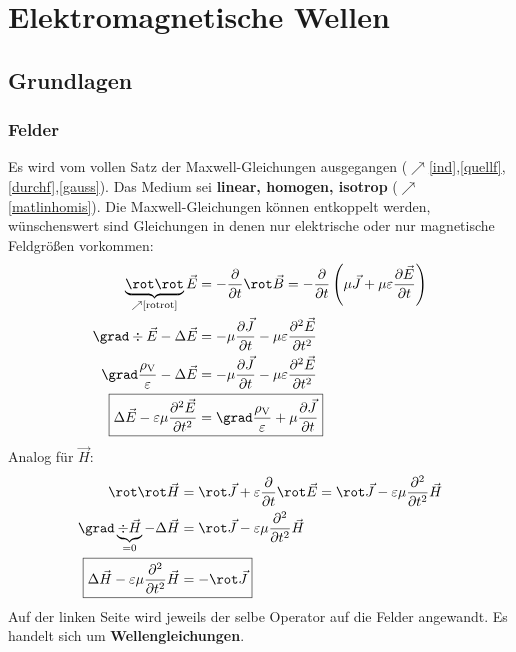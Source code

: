 \chapter{Elektromagnetische Wellen}\label{emwellen}
 \section{Grundlagen} \label{emwellgrdl}
 \subsection{Felder}
 Es wird vom vollen Satz der Maxwell-Gleichungen ausgegangen ($\nearrow$\ref{ind},\ref{quellf},\ref{durchf},\ref{gauss}). Das Medium sei \textbf{linear, homogen, isotrop} ($\nearrow$\ref{matlinhomis}). Die Maxwell-Gleichungen können entkoppelt werden, wünschenswert sind Gleichungen in denen nur elektrische oder nur magnetische Feldgrößen vorkommen:
		        \begin{align}
			        \underbrace{\rot \rot }_{\nearrow \text{\ref{rotrot}} }\vec{E}                 & = -\frac{\partial }{\partial t}\rot \vec{B}  = -\frac{\partial}{\partial t}\left(\mu \vec{J}+\mu \varepsilon\frac{\partial \vec{E}}{\partial t}\right) \nonumber \\
			        \grad \div \vec{E}-\Delta \vec{E}                                    & = -\mu \frac{\partial \vec{J}}{\partial t}-\mu\varepsilon\frac{\partial^2 \vec{E}}{\partial t^2}                                                  \nonumber     \\
			        \grad \frac{\rho_\text{V}}{\varepsilon}-\Delta \vec{E}               & = -\mu \frac{\partial \vec{J}}{\partial t}-\mu \varepsilon\frac{\partial^2 \vec{E}}{\partial t^2}                                                    \nonumber  \\
			        \Aboxed{\Delta \vec{E}-\varepsilon\mu \frac{\partial^2\vec{E}}{\partial t^2} & = \grad \frac{\rho_\text{V}}{\varepsilon}+\mu \frac{\partial \vec{J}}{\partial t}} \label{Hentk}
		        \end{align}
		   Analog für $\vec{H} $:
		        \begin{align}
			        \rot \rot \vec{H}                                      & = \rot \vec{J} +\varepsilon\frac{\partial}{\partial t}\rot \vec{E} = \rot \vec{J}-\varepsilon\mu\frac{\partial^2}{\partial t^2}\vec{H}                     \nonumber   \\
			        \grad \underbrace{\div \vec{H} }_{=0} - \Delta \vec{H} & = \rot \vec{J}-\varepsilon\mu\frac{\partial^2}{\partial t^2}\vec{H} \nonumber \\
			        \Aboxed{ \Delta \vec{H} -\varepsilon\mu\frac{\partial^2}{\partial t^2}\vec{H} &= -\rot \vec{J}} \label{Eentk}
		        \end{align}
Auf der linken Seite wird jeweils der selbe Operator auf die Felder angewandt. Es handelt sich um \textbf{Wellengleichungen}.
